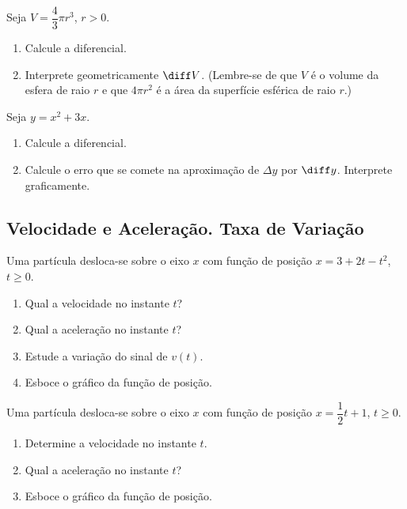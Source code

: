 \begin{exercicio}[3]
Seja $V = \dfrac{4}{3}\pi r^3$, $r > 0$.
\begin{enumerate}[label=\alph*)]
    \item Calcule a diferencial.
    \item Interprete geometricamente $\diff V$. (Lembre-se de que $V$ é o volume da esfera de raio $r$ e que $4\pi r^2$ é a área da superfície esférica de raio $r$.)
\end{enumerate}
\end{exercicio}

\begin{exercicio}[4]
Seja $y = x^2 + 3x$.
\begin{enumerate}[label=\alph*)]
    \item Calcule a diferencial.
    \item Calcule o erro que se comete na aproximação de $\Delta y$ por $\diff y$. Interprete graficamente.
\end{enumerate}
\end{exercicio}

\clearpage

\subsection{Velocidade e Aceleração. Taxa de Variação}

\begin{exercicio}[1]
Uma partícula desloca-se sobre o eixo $x$ com função de posição $x = 3 + 2t - t^2$, $t \ge 0$.
\begin{enumerate}[label=\alph*)]
    \item Qual a velocidade no instante $t$?
    \item Qual a aceleração no instante $t$?
    \item Estude a variação do sinal de $v(t)$.
    \item Esboce o gráfico da função de posição.
\end{enumerate}
\end{exercicio}

\begin{exercicio}[2]
Uma partícula desloca-se sobre o eixo $x$ com função de posição $x = \dfrac{1}{2}t + 1$, $t \ge 0$.
\begin{enumerate}[label=\alph*)]
    \item Determine a velocidade no instante $t$.
    \item Qual a aceleração no instante $t$?
    \item Esboce o gráfico da função de posição.
\end{enumerate}
\end{exercicio}

